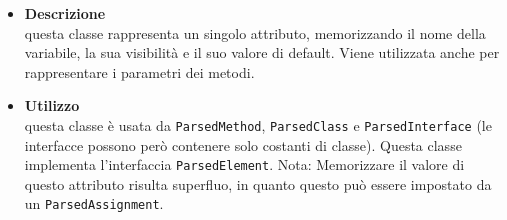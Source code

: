 \begin{itemize}
\item \textbf{Descrizione}\\
questa classe rappresenta un singolo attributo, memorizzando il nome della variabile, la sua visibilità e il suo valore di default. Viene utilizzata anche per rappresentare i parametri dei metodi.
\item \textbf{Utilizzo}\\
questa classe è usata da \texttt{ParsedMethod},  \texttt{ParsedClass} e \texttt{ParsedInterface} (le interfacce possono però contenere solo costanti di classe).
Questa classe implementa l'interfaccia \texttt{ParsedElement}.
Nota: Memorizzare il valore di questo attributo risulta superfluo, in quanto questo può essere impostato da un \texttt{ParsedAssignment}. 


\end{itemize}
